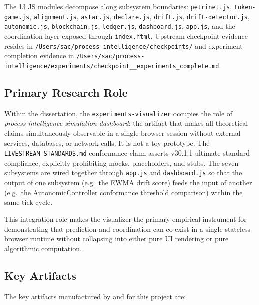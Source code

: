 The 13 JS modules decompose along subsystem boundaries:
\texttt{petrinet.js}, \texttt{token-game.js}, \texttt{alignment.js}, \texttt{astar.js},
\texttt{declare.js}, \texttt{drift.js}, \texttt{drift-detector.js}, \texttt{autonomic.js},
\texttt{blockchain.js}, \texttt{ledger.js}, \texttt{dashboard.js}, \texttt{app.js},
and the coordination layer exposed through \texttt{index.html}. Upstream checkpoint evidence
resides in \texttt{/Users/sac/process-intelligence/checkpoints/} and experiment completion
evidence in \texttt{/Users/sac/process-intelligence/experiments/checkpoint\_\_experiments\_complete.md}.

\subsection{Primary Research Role}
\label{sec:experiments-visualizer-identity-role}

Within the dissertation, the \texttt{experiments-visualizer} occupies the role of
\emph{process-intelligence-simulation-dashboard}: the artifact that makes all theoretical claims
simultaneously observable in a single browser session without external services, databases, or
network calls. It is not a toy prototype. The \texttt{LIVESTREAM\_STANDARDS.md} conformance claim
asserts v30.1.1 ultimate standard compliance, explicitly prohibiting mocks, placeholders, and
stubs. The seven subsystems are wired together through \texttt{app.js} and \texttt{dashboard.js}
so that the output of one subsystem (e.g.\ the EWMA drift score) feeds the input of another
(e.g.\ the AutonomicController conformance threshold comparison) within the same tick cycle.

This integration role makes the visualizer the primary empirical instrument for demonstrating
that prediction and coordination can co-exist in a single stateless browser runtime without
collapsing into either pure UI rendering or pure algorithmic computation.

\subsection{Key Artifacts}
\label{sec:experiments-visualizer-identity-artifacts}

The key artifacts manufactured by and for this project are:

